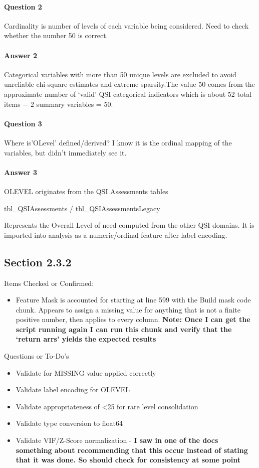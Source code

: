 \documentclass[12pt, letterpaper]{article}
\begin{document}
\paragraph{Question 2} Cardinality is number of levels of each variable being considered. Need to check whether the number 50 is correct.
\paragraph{Answer 2} Categorical variables with more than 50 unique levels are excluded to avoid unreliable chi-square estimates and extreme sparsity.The value 50 comes from the approximate number of `valid' QSI categorical indicators which is about 52 total items − 2 summary variables = 50.
\paragraph{Question 3} Where is'OLevel' defined/derived? I know it is the ordinal mapping of the variables, but didn't immediately see it.
\paragraph{Answer 3}OLEVEL originates from the QSI Assessments tables 

tbl_QSIAssessments / tbl_QSIAssessmentsLegacy

Represents the Overall Level of need computed from the other QSI domains. It is imported into analysis as a numeric/ordinal feature after label-encoding.

\subsection{Section 2.3.2} Items Checked or Confirmed:\\
\begin{itemize}
	\item Feature Mask is accounted for  starting at line 599 with the Build mask code chunk. Appears to assign a missing value for anything that is not a finite positive number, then applies to every column. \bf{Note: Once I can get the script running again I can run this chunk and verify that the `return arrs' yields the expected results}

\end{itemize}

Questions or To-Do's\\
\begin{itemize}
	\item Validate for MISSING value applied correctly
	\item Validate label encoding for OLEVEL
	\item Validate appropriateness of <25 for rare level consolidation
	\item Validate type conversion to float64
	\item Validate VIF/Z-Score normalization - \textbf{I saw in one of the docs something about recommending that this occur instead of stating that it was done. So should check for consistency at some point}
\end{itemize}
\end{document}
